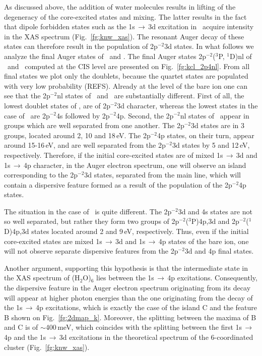 \begin{enumerate}
As discussed above, the addition of water molecules results in lifting of the degeneracy of the core-excited states and mixing. The latter results in the fact that dipole forbidden states such as the 1s$\,\rightarrow\,$3d excitation in \ki~acquire intensity in the XAS spectrum (Fig.\ \ref{fg:knw_xas}). The resonant Auger decay of these states can therefore result in the population of 2p$^{-2}$3d states. In what follows we analyze the final Auger states of \ki~and \cli. The final Auger states 2p$^{-2}$($^3$P, $^1$D)nl of \ki~and \cli~computed at the CIS level are presented on Fig.\ \ref{fg:kcl_2p4nl}. From all final states we plot only the doublets, because the quartet states are populated with very low probability (REFS). Already at the level of the bare ion one can see that the 2p$^{-2}$nl states of \ki~and \cli~are substantially different. First of all, the lowest doublet states of \ki, are of 2p$^{-2}$3d character, whereas the lowest states in the case of \cli~are 2p$^{-2}$4s followed by 2p$^{-2}$4p. Second, the 2p$^{-2}$nl states of \ki~appear in groups which are well separated from one another. The 2p$^{-2}$3d states are in 3 groups, located around 2, 10 and 18\,eV. The 2p$^{-2}$4p states, on their turn, appear around 15-16\,eV, and are well separated from the 2p$^{-2}$3d states by 5 and 12\,eV, respectively. Therefore, if the initial core-excited states are of mixed 1s$\,\rightarrow\,$3d and 1s$\,\rightarrow\,$4p character, in the Auger electron spectrum, one will observe an island corresponding to the 2p$^{-2}$3d states, separated from the main line, which will contain a dispersive feature formed as a result of the population of the 2p$^{-2}$4p states.


The situation in the case of \cli~is quite different. The 2p$^{-2}$3d and 4s states are not so well separated, but rather they form two groups of 2p$^{-2}$($^3$P)4p,3d and 2p$^{-2}$($^1$D)4p,3d states located around 2 and 9\,eV, respectively. Thus, even if the initial core-excited states are mixed 1s$\,\rightarrow\,$3d and 1s$\,\rightarrow\,$4p states of the bare ion, one will not observe separate dispersive features from the 2p$^{-2}$3d and 4p final states.

Another argument, supporting this hypothesis is that the intermediate state in the XAS spectrum of \ki(H$_2$O)$_6$ lies between the 1s$\,\rightarrow\,$4p excitations. Consequently, the dispersive feature in the Auger electron spectrum originating from its decay will appear at higher photon energies than the one originating from the decay of the 1s$\,\rightarrow\,$4p excitations, which is exactly the case of the island C and the feature B shown on Fig.\ \ref{fg:2dmap_k}. Moreover, the splitting between the maxima of B and C is of $\sim$400\,meV, which coincides with the splitting between the first 1s$\,\rightarrow\,$4p and the 1s$\,\rightarrow\,$3d excitations in the theoretical spectrum of the 6-coordinated cluster (Fig.\ \ref{fg:knw_xas}).


\end{enumerate}

